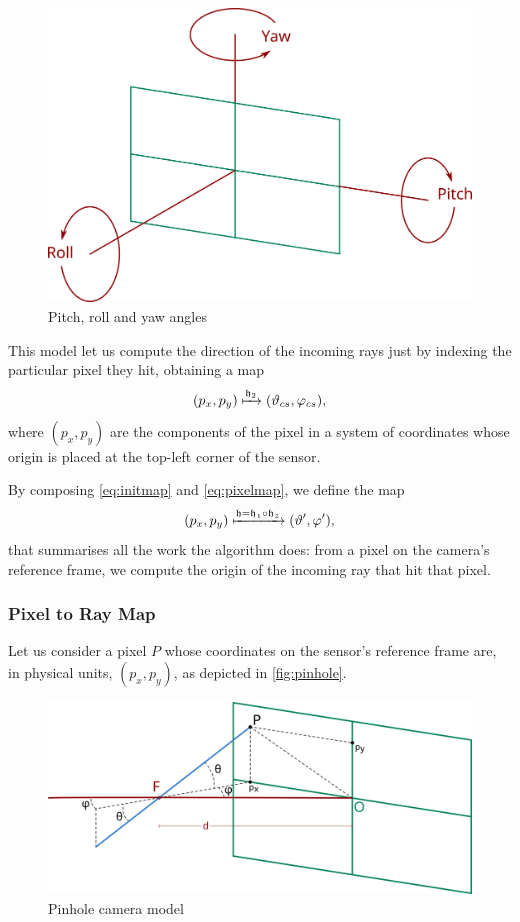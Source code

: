 \begin{figure}[bth]
	\myfloatalign
	\includegraphics[width=.8\linewidth]{gfx/rollpitchyaw.png}
	\caption[Pitch, roll and yaw angles]{Pitch, roll and yaw angles}
	\label{fig:pitchrollyaw}
\end{figure}

This model let us compute the direction of the incoming rays just by indexing the particular pixel they hit, obtaining a map
\begin{equation}
\label{eq:pixelmap}
(p_x, p_y) \xmapsto{\mathfrak{h}_2} (\vartheta_{cs}, \varphi_{cs}),
\end{equation}
where $(p_x, p_y)$ are the components of the pixel in a system of coordinates whose origin is placed at the top-left corner of the sensor.

By composing \autoref{eq:initmap} and \autoref{eq:pixelmap}, we define the map
\begin{equation}
(p_x, p_y) \xmapsto{\mathfrak{h} = \mathfrak{h_1}\circ\mathfrak{h_2}} (\vartheta', \varphi'),
\end{equation}
that summarises all the work the algorithm does: from a pixel on the camera's reference frame, we compute the origin of the incoming ray that hit that pixel.

\subsubsection*{Pixel to Ray Map}
\label{subcsec:pixeltoray}

Let us consider a pixel $P$ whose coordinates on the sensor's reference frame are, in physical units, $(p_x, p_y)$, as depicted in \autoref{fig:pinhole}.

\begin{figure}[bth]
	\myfloatalign
	\includegraphics[width=.8\linewidth]{gfx/pinhole.png}
	\caption[Pinhole camera model]{Pinhole camera model}
	\label{fig:pinhole}
\end{figure}

